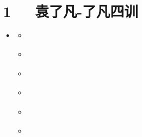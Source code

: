 \documentclass[letterpaper,12pt,english]{sphinxmanual}
\begin{document}
\chapter{1   袁了凡-了凡四训}
\label{\detokenize{p00_u5176_u5b83/_u8881_u4e86_u51e1-_u4e86_u51e1_u56db_u8bad:id1}}\label{\detokenize{p00_u5176_u5b83/_u8881_u4e86_u51e1-_u4e86_u51e1_u56db_u8bad::doc}}
\begin{sphinxShadowBox}
\begin{itemize}
\item {} 
\label{\detokenize{p00_u5176_u5b83/_u8881_u4e86_u51e1-_u4e86_u51e1_u56db_u8bad:id9}}{\hyperref[\detokenize{p00_u5176_u5b83/_u8881_u4e86_u51e1-_u4e86_u51e1_u56db_u8bad:id1}]{}}
\begin{itemize}
\item {} 
\label{\detokenize{p00_u5176_u5b83/_u8881_u4e86_u51e1-_u4e86_u51e1_u56db_u8bad:id10}}{\hyperref[\detokenize{p00_u5176_u5b83/_u8881_u4e86_u51e1-_u4e86_u51e1_u56db_u8bad:id3}]{}}

\item {} 
\label{\detokenize{p00_u5176_u5b83/_u8881_u4e86_u51e1-_u4e86_u51e1_u56db_u8bad:id11}}{\hyperref[\detokenize{p00_u5176_u5b83/_u8881_u4e86_u51e1-_u4e86_u51e1_u56db_u8bad:id4}]{}}

\item {} 
\label{\detokenize{p00_u5176_u5b83/_u8881_u4e86_u51e1-_u4e86_u51e1_u56db_u8bad:id12}}{\hyperref[\detokenize{p00_u5176_u5b83/_u8881_u4e86_u51e1-_u4e86_u51e1_u56db_u8bad:id5}]{}}

\item {} 
\label{\detokenize{p00_u5176_u5b83/_u8881_u4e86_u51e1-_u4e86_u51e1_u56db_u8bad:id13}}{\hyperref[\detokenize{p00_u5176_u5b83/_u8881_u4e86_u51e1-_u4e86_u51e1_u56db_u8bad:id6}]{}}

\item {} 
\label{\detokenize{p00_u5176_u5b83/_u8881_u4e86_u51e1-_u4e86_u51e1_u56db_u8bad:id14}}{\hyperref[\detokenize{p00_u5176_u5b83/_u8881_u4e86_u51e1-_u4e86_u51e1_u56db_u8bad:id7}]{}}

\item {} 
\label{\detokenize{p00_u5176_u5b83/_u8881_u4e86_u51e1-_u4e86_u51e1_u56db_u8bad:id15}}{\hyperref[\detokenize{p00_u5176_u5b83/_u8881_u4e86_u51e1-_u4e86_u51e1_u56db_u8bad:id8}]{}}

\end{itemize}

\end{itemize}
\end{sphinxShadowBox}
\end{document}
